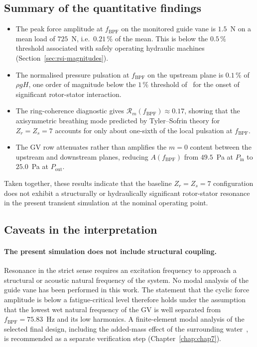 \subsection{Summary of the quantitative findings}
\label{sec:results-fft-summary}
 
\begin{itemize}
  \item The peak force amplitude at $f_{\mathrm{BPF}}$ on the
        monitored guide vane is $1.5$~N on a mean load of
        $725$~N, i.e.\ $0.21\,\%$ of the mean. This is below the
        $0.5\,\%$ threshold associated with safely operating
        hydraulic machines (Section~\ref{sec:rsi-magnitudes}).
  \item The normalised pressure pulsation at $f_{\mathrm{BPF}}$ on
        the upstream plane is $0.1\,\%$ of $\rho g H$, one order of
        magnitude below the $1\,\%$ threshold
        of~\cite{Brekke2015,Brekke2010} for the onset of significant
        rotor-stator interaction.
  \item The ring-coherence diagnostic gives
        $\mathcal{R}_m(f_{\mathrm{BPF}}) \approx 0.17$, showing
        that the axisymmetric breathing mode predicted by
        Tyler--Sofrin theory for $Z_r = Z_s = 7$ accounts for only
        about one-sixth of the local pulsation at
        $f_{\mathrm{BPF}}$.
  \item The GV row attenuates rather than amplifies the $m=0$
        content between the upstream and downstream planes,
        reducing $A(f_{\mathrm{BPF}})$ from $49.5$~Pa at
        $P_{\mathrm{in}}$ to $25.0$~Pa at $P_{\mathrm{out}}$.
\end{itemize}
 
Taken together, these results indicate that the baseline
$Z_r = Z_s = 7$ configuration does not exhibit a structurally or
hydraulically significant rotor-stator resonance in the present
transient simulation at the nominal operating point.
 
\subsection{Caveats in the interpretation}
\label{sec:results-fft-caveats}
 
\paragraph{The present simulation does not include structural
coupling.} Resonance in the strict sense requires an excitation
frequency to approach a structural or acoustic natural frequency of
the system. No modal analysis of the guide vane has been performed
in this work. The statement that the cyclic force amplitude is
below a fatigue-critical level therefore holds under the assumption
that the lowest wet natural frequency of the GV is well
separated from $f_{\mathrm{BPF}} = 75.83$~Hz and its low harmonics.
A finite-element modal analysis of the selected final design,
including the added-mass effect of the surrounding
water~\cite{Valentin2015}, is recommended as a separate
verification step (Chapter~\ref{chap:chap7}).
 
